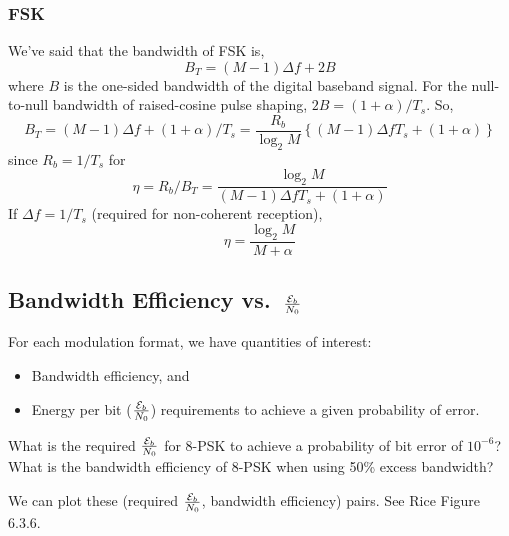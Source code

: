 \subsubsection{FSK}

We've said that the bandwidth of FSK is,
\[
B_T = (M-1) \Delta f + 2B
\]
where $B$ is the one-sided bandwidth of the digital baseband signal.
For the null-to-null bandwidth of  raised-cosine pulse shaping,
$2B=(1+\alpha)/T_{s}$. So,
\[
B_T = (M-1) \Delta f + (1+\alpha)/T_{s} = \frac{R_b}{\log_2 M}
\left\{(M-1)\Delta f T_{s} + (1+\alpha) \right\}
\]
since $R_b = 1/T_{s}$ for
\[
  \eta = R_b/B_T = \frac{\log_2 M}{(M-1)\Delta f T_{s} + (1+\alpha)}
\]
If $\Delta f = 1/T_s$ (required for non-coherent reception),
\[
  \eta = \frac{\log_2 M}{M+\alpha}
\]


\subsection{Bandwidth Efficiency vs.~$\frac{\mathcal{E}_b}{N_0}$}

For each modulation format, we have quantities of interest:
\begin{itemize}
  \item Bandwidth efficiency, and
  \item Energy per bit ($\frac{\mathcal{E}_b}{N_0}$) requirements to achieve a given
  probability of error.
\end{itemize}

 What is the
required $\frac{\mathcal{E}_b}{N_0}$ for 8-PSK to achieve a probability of bit error of
$10^{-6}$?  What is the bandwidth efficiency of 8-PSK when using
50\% excess bandwidth?


We can plot these (required $\frac{\mathcal{E}_b}{N_0}$, bandwidth efficiency) pairs.
 See Rice Figure 6.3.6.